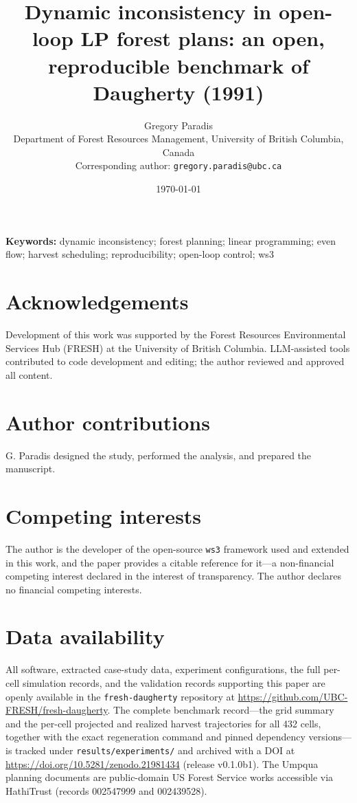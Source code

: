 \documentclass[12pt]{article}
\title{Dynamic inconsistency in open-loop LP forest plans: an open, reproducible benchmark of Daugherty (1991)}
\author{Gregory Paradis\\Department of Forest Resources Management, University of British Columbia, Canada\\Corresponding author: \texttt{gregory.paradis@ubc.ca}}
\date{\today}
\begin{document}
\maketitle

\noindent\textbf{Keywords:} dynamic inconsistency; forest planning; linear programming; even flow; harvest scheduling; reproducibility; open-loop control; ws3










\section*{Acknowledgements}
Development of this work was supported by the Forest Resources Environmental Services Hub (FRESH) at the University of British Columbia. LLM-assisted tools contributed to code development and editing; the author reviewed and approved all content.

\section*{Author contributions}
G. Paradis designed the study, performed the analysis, and prepared the manuscript.

\section*{Competing interests}
The author is the developer of the open-source \texttt{ws3} framework used and extended in this work, and the paper provides a citable reference for it---a non-financial competing interest declared in the interest of transparency. The author declares no financial competing interests.

\section*{Data availability}
All software, extracted case-study data, experiment configurations, the full per-cell simulation records, and the validation records supporting this paper are openly available in the \texttt{fresh-daugherty} repository at \url{https://github.com/UBC-FRESH/fresh-daugherty}. The complete benchmark record---the grid summary and the per-cell projected and realized harvest trajectories for all 432 cells, together with the exact regeneration command and pinned dependency versions---is tracked under \texttt{results/experiments/} and archived with a DOI at \url{https://doi.org/10.5281/zenodo.21981434} (release v0.1.0b1). The Umpqua planning documents are public-domain US Forest Service works accessible via HathiTrust (records 002547999 and 002439528).



\end{document}
